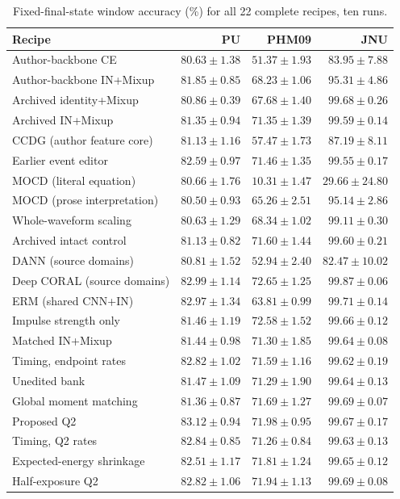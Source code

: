 \begin{table}[pos=htbp]
\centering\footnotesize
\caption{Fixed-final-state window accuracy (\%) for all 22 complete recipes, ten runs.}
\label{tab:all-last}
\begin{tabular}{lrrr}
\toprule
Recipe & PU & PHM09 & JNU\\
\midrule
Author-backbone CE & $80.63\pm1.38$ & $51.37\pm1.93$ & $83.95\pm7.88$\\
Author-backbone IN+Mixup & $81.85\pm0.85$ & $68.23\pm1.06$ & $95.31\pm4.86$\\
Archived identity+Mixup & $80.86\pm0.39$ & $67.68\pm1.40$ & $99.68\pm0.26$\\
Archived IN+Mixup & $81.35\pm0.94$ & $71.35\pm1.39$ & $99.59\pm0.14$\\
CCDG (author feature core) & $81.13\pm1.16$ & $57.47\pm1.73$ & $87.19\pm8.11$\\
Earlier event editor & $82.59\pm0.97$ & $71.46\pm1.35$ & $99.55\pm0.17$\\
MOCD (literal equation) & $80.66\pm1.76$ & $10.31\pm1.47$ & $29.66\pm24.80$\\
MOCD (prose interpretation) & $80.50\pm0.93$ & $65.26\pm2.51$ & $95.14\pm2.86$\\
Whole-waveform scaling & $80.63\pm1.29$ & $68.34\pm1.02$ & $99.11\pm0.30$\\
Archived intact control & $81.13\pm0.82$ & $71.60\pm1.44$ & $99.60\pm0.21$\\
DANN (source domains) & $80.81\pm1.52$ & $52.94\pm2.40$ & $82.47\pm10.02$\\
Deep CORAL (source domains) & $82.99\pm1.14$ & $72.65\pm1.25$ & $99.87\pm0.06$\\
ERM (shared CNN+IN) & $82.97\pm1.34$ & $63.81\pm0.99$ & $99.71\pm0.14$\\
Impulse strength only & $81.46\pm1.19$ & $72.58\pm1.52$ & $99.66\pm0.12$\\
Matched IN+Mixup & $81.44\pm0.98$ & $71.30\pm1.85$ & $99.64\pm0.08$\\
Timing, endpoint rates & $82.82\pm1.02$ & $71.59\pm1.16$ & $99.62\pm0.19$\\
Unedited bank & $81.47\pm1.09$ & $71.29\pm1.90$ & $99.64\pm0.13$\\
Global moment matching & $81.36\pm0.87$ & $71.69\pm1.27$ & $99.69\pm0.07$\\
Proposed Q2 & $83.12\pm0.94$ & $71.98\pm0.95$ & $99.67\pm0.17$\\
Timing, Q2 rates & $82.84\pm0.85$ & $71.26\pm0.84$ & $99.63\pm0.13$\\
Expected-energy shrinkage & $82.51\pm1.17$ & $71.81\pm1.24$ & $99.65\pm0.12$\\
Half-exposure Q2 & $82.82\pm1.06$ & $71.94\pm1.13$ & $99.69\pm0.08$\\
\bottomrule
\end{tabular}
\end{table}
